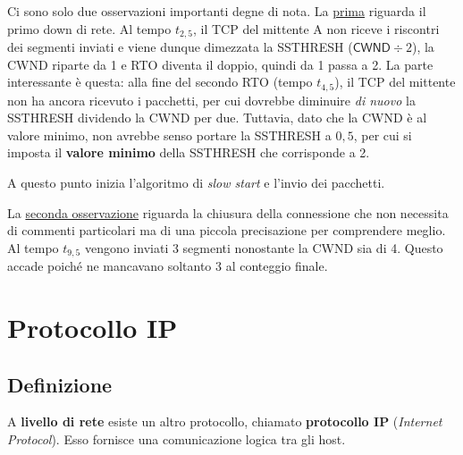 \documentclass[a4paper]{article}
\begin{document}
	\noindent
	Ci sono solo due osservazioni importanti degne di nota. La \underline{prima} riguarda il primo down di rete. Al tempo $t_{2,5}$, il TCP del mittente A non riceve i riscontri dei segmenti inviati e viene dunque dimezzata la \textsf{SSTHRESH} ($\textsf{CWND} \div 2$), la \textsf{CWND} riparte da 1 e \textsf{RTO} diventa il doppio, quindi da 1 passa a 2. La parte interessante è questa: alla fine del secondo \textsf{RTO} (tempo $t_{4,5}$), il TCP del mittente non ha ancora ricevuto i pacchetti, per cui dovrebbe diminuire \emph{di nuovo} la \textsf{SSTHRESH} dividendo la \textsf{CWND} per due. Tuttavia, dato che la \textsf{CWND} è al valore minimo, non avrebbe senso portare la \textsf{SSTHRESH} a $0,5$, per cui si imposta il \textbf{valore minimo} della \textsf{SSTHRESH} che corrisponde a 2.\newline
	
	\noindent
	A questo punto inizia l’algoritmo di \emph{slow start} e l’invio dei pacchetti.\newline
	
	\noindent
	La \underline{seconda osservazione} riguarda la chiusura della connessione che non necessita di commenti particolari ma di una piccola precisazione per comprendere meglio. Al tempo $t_{9,5}$ vengono inviati 3 segmenti nonostante la \textsf{CWND} sia di 4. Questo accade poiché ne mancavano soltanto 3 al conteggio finale.\newpage
	
	\section{Protocollo IP}
	
	\subsection{Definizione}
	
	A \textbf{livello di rete} esiste un altro protocollo, chiamato \textcolor{Red3}{\textbf{protocollo IP}} (\emph{Internet Protocol}). Esso fornisce una comunicazione logica tra gli host.\newline
	
\end{document}
